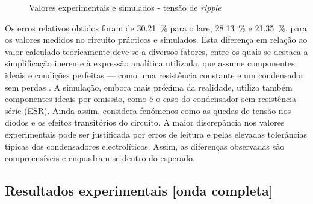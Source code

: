 \begin{figure}[hbtp]
	\centering%
		\centering
		\qquad
		\caption{Valores experimentais e simulados - tensão de \textit{ripple}}%
		\label{fig:simulacaoripple}%
	\end{figure}

Os erros relativos obtidos foram de \SI{30.21}{\percent} para o \acrshort{lare}, \SI{28.13}{\percent} e \SI{21.35}{\percent}, para os valores medidos no circuito prácticos e simulados. Esta diferença em relação ao valor calculado teoricamente deve-se a diversos fatores, entre os quais se destaca a simplificação inerente à expressão analítica utilizada, que assume componentes ideais e condições perfeitas — como uma resistência constante e um condensador sem perdas \cite{sedrasmith}. A simulação, embora mais próxima da realidade, utiliza também componentes ideais por omissão, como é o caso do condensador sem resistência série (ESR). Ainda assim, considera fenómenos como as quedas de tensão nos díodos e os efeitos transitórios do circuito. A maior discrepância nos valores experimentais pode ser justificada por erros de leitura e pelas elevadas tolerâncias típicas dos condensadores electrolíticos. Assim, as diferenças observadas são compreensíveis e enquadram-se dentro do esperado.

\subsection{Resultados experimentais [onda completa]}
\label{sec:resultados_RectificadoresOndacompleta}

